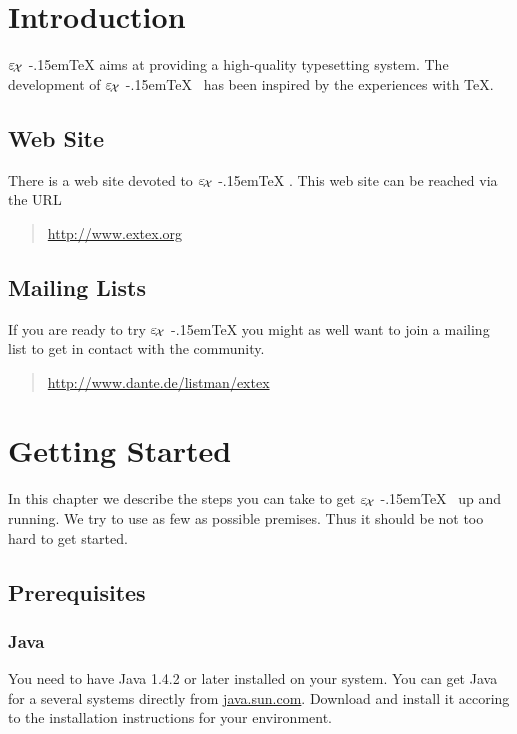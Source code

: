 \documentclass[12pt,div12,a4paper]{scrbook}
\providecommand*{\ExTeX}{\ifx\texorpdfstring\undefined
  \textrm{%
    \ensuremath{\textstyle\varepsilon_{\kern-0.15em\mathcal{X}}}%
    \kern-.15em\TeX}%
  \else\texorpdfstring{%
  \textrm{%
    \ensuremath{\textstyle\varepsilon_{\kern-0.15em\mathcal{X}}}%
    \kern-.15em\TeX
  }}{ExTeX}%
  \fi
}
\begin{document}
\newpage
\tableofcontents
\newpage

\chapter{Introduction}

\ExTeX{} aims at providing a high-quality typesetting system. The
development of \ExTeX\ has been inspired by the experiences with \TeX.


\section{Web Site}

There is a web site devoted to \ExTeX. This web site can be reached
via the URL

\begin{quotation}
  \url{http://www.extex.org}
\end{quotation}


\section{Mailing Lists}

If you are ready to try \ExTeX{} you might as well want to join a
mailing list to get in contact with the community.

\begin{quotation}
  \url{http://www.dante.de/listman/extex}
\end{quotation}


\chapter{Getting Started}

In this chapter we describe the steps you can take to get \ExTeX\ up
and running. We try to use as few as possible premises. Thus it should
be not too hard to get started.

\section{Prerequisites}

\subsection{Java}

You need to have Java 1.4.2 or later installed on your system. You can
get Java for a several systems directly from \url{java.sun.com}.
Download and install it accoring to the installation instructions for
your environment.
\end{document}
